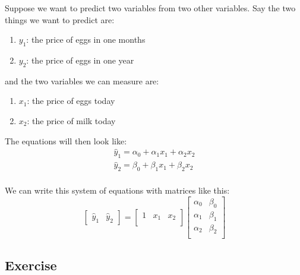 \documentclass[11pt]{article}
\newcommand\yhat{\hat{y}}
\begin{document}
Suppose we want to predict two variables from two other variables.
Say the two things we want to predict are:
\begin{enumerate}
    \item $y_1$: the price of eggs in one months
    \item $y_2$: the price of eggs in one year
\end{enumerate}
and the two variables we can measure are:
\begin{enumerate}
    \item $x_1$: the price of eggs today
    \item $x_2$: the price of milk today
\end{enumerate}

The equations will then look like:
\begin{equation}
    \begin{array}{l}
    \yhat_1 = \alpha_0 + \alpha_1 x_1  + \alpha_2 x_2 \\
    \yhat_2 = \beta_0 + \beta_1 x_1  + \beta_2 x_2 \\
    \end{array}
\end{equation}

We can write this system of equations with matrices like this:
\begin{equation}
    \begin{bmatrix}
        \yhat_1 & \yhat_2
    \end{bmatrix} = 
    \begin{bmatrix}
        1 & x_1 & x_2 \\
    \end{bmatrix}
    \begin{bmatrix}
        \alpha_0 & \beta_0 \\
        \alpha_1 & \beta_1 \\
        \alpha_2 & \beta_2 \\
    \end{bmatrix}
\end{equation}




\subsection{ Exercise }
\end{document}
